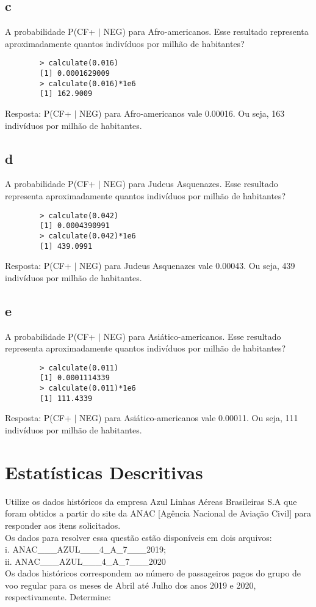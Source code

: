\documentclass{article}[twocolumn]
\begin{document}
	\subsection{c}
	A  probabilidade  P(CF+  $|$  NEG)  para  Afro-americanos. Esse  resultado
	representa aproximadamente quantos indivíduos por milhão de habitantes?
	\begin{verbatim}
		> calculate(0.016)
		[1] 0.0001629009
		> calculate(0.016)*1e6
		[1] 162.9009
	\end{verbatim}
	Resposta: P(CF+ $|$ NEG) para Afro-americanos vale 0.00016. Ou seja,
	163 indivíduos por milhão de habitantes.
	\subsection{d}
	A  probabilidade  P(CF+  $|$  NEG)  para  Judeus Asquenazes. Esse  resultado
	representa aproximadamente quantos indivíduos por milhão de habitantes?
	\begin{verbatim}
		> calculate(0.042)
		[1] 0.0004390991
		> calculate(0.042)*1e6
		[1] 439.0991
	\end{verbatim}
	Resposta: P(CF+ $|$ NEG) para Judeus Asquenazes vale 0.00043. Ou seja,
	439 indivíduos por milhão de habitantes.
	\subsection{e}
	A  probabilidade  P(CF+  $|$  NEG)  para  Asiático-americanos. Esse  resultado
	representa aproximadamente quantos indivíduos por milhão de habitantes?
	\begin{verbatim}
		> calculate(0.011)
		[1] 0.0001114339
		> calculate(0.011)*1e6
		[1] 111.4339
	\end{verbatim}
	Resposta: P(CF+ $|$ NEG) para Asiático-americanos vale 0.00011. Ou seja,
	111 indivíduos por milhão de habitantes.
	\section{Estatísticas Descritivas}
	Utilize os dados históricos da empresa Azul Linhas Aéreas Brasileiras S.A que foram obtidos
	a partir do site da ANAC [Agência Nacional de Aviação Civil] para responder aos itens
	solicitados.\\
	Os dados para resolver essa questão estão disponíveis em dois arquivos:\\
	i. ANAC\_\_\_AZUL\_\_\_4\_A\_7\_\_\_2019;\\
	ii. ANAC\_\_\_AZUL\_\_\_4\_A\_7\_\_\_2020\\
	Os dados históricos correspondem ao número de
	passageiros pagos do grupo de voo regular para os meses de Abril até Julho dos anos 2019 e
	2020, respectivamente.
	Determine:
\end{document}
